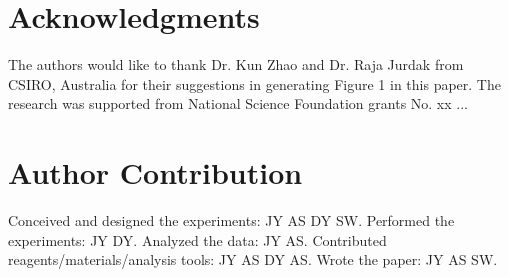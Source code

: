\documentclass[10pt,letterpaper]{article}
\begin{document}
%
%




\section*{Acknowledgments}
The authors would like to thank Dr. Kun Zhao and Dr. Raja Jurdak from CSIRO, Australia for their suggestions in generating Figure 1 in this paper. 
The research was supported from National Science Foundation grants No. xx ...

\section*{Author Contribution}
Conceived and designed the experiments: JY AS DY SW. Performed the experiments: JY DY. Analyzed the data: JY AS. Contributed reagents/materials/analysis tools: JY AS DY AS. Wrote the paper: JY AS SW.

\nolinenumbers
\end{document}
